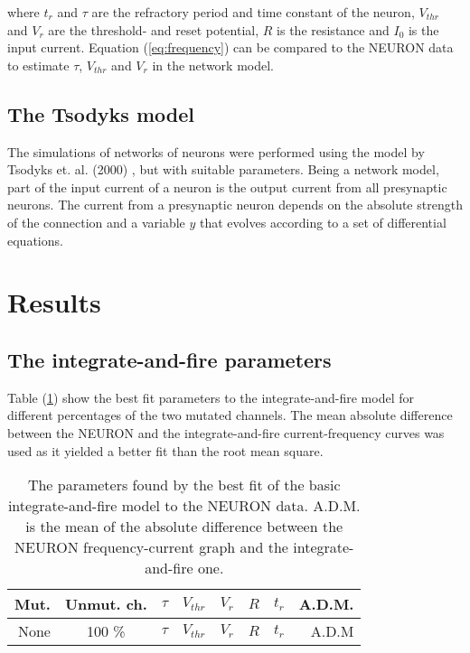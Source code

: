 \documentclass[twocolumn, a4paper,10pt, norsk]{scrartcl}
\begin{document}
where $t_r$ and $\tau$ are the refractory period and time constant of the neuron, $V_{thr}$ and $V_{r}$ are the threshold- and reset potential, $R$ is the resistance and $I_0$ is the input current. Equation (\ref{eq:frequency}) can be compared to the NEURON data to estimate $\tau$, $V_{thr}$ and $V_r$ in the network model. %


\subsection*{The Tsodyks model}
The simulations of networks of neurons were performed using the model by Tsodyks et. al. (2000) \cite{Tsodyks}, but with suitable parameters. Being a network model, part of the input current of a neuron is the output current from all presynaptic neurons. %
The current from a presynaptic neuron depends on the absolute strength of the connection and a variable $y$ that evolves according to a set of differential equations.

\section*{Results}
\subsection*{The integrate-and-fire parameters}
Table (\ref{table:integrate-and-fire_parameters}) show the best fit parameters to the integrate-and-fire model for different percentages of the two mutated channels. The mean absolute difference between the NEURON and the integrate-and-fire current-frequency curves was used as it yielded a better fit than the root mean square.

\begin{table}
 \centering
 \caption{The parameters found by the best fit of the basic integrate-and-fire model to the NEURON data. A.D.M. is the mean of the absolute difference between the NEURON frequency-current graph and the integrate-and-fire one.}
 \begin{tabular}{r|c|r|r|r|r|r|r} %
  Mut. & Unmut. ch. & $\tau$ & $V_{thr}$ & $V_{r}$ & $R$ & $t_r$ & A.D.M.\\
  \hline
  None & 100 \% & $\tau$ & $V_{thr}$ & $V_{r}$ & $R$ & $t_r$ & A.D.M\\ %
 \end{tabular}
\label{table:integrate-and-fire_parameters}
\end{table}
\end{document}
